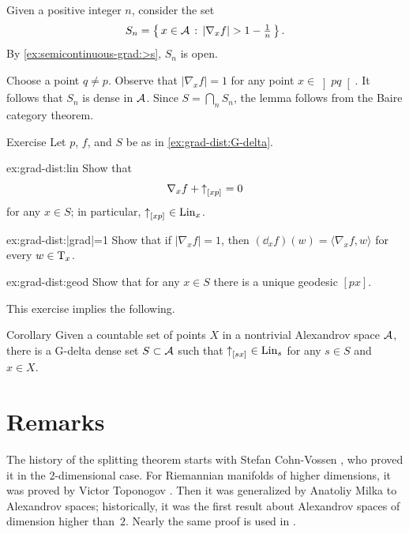 Given a positive integer $n$, consider the set
\[S_n=\set{x\in\spc{A}}{|\nabla_xf|>1-\tfrac1n}.\]
By \ref{ex:semicontinuous-grad:>s}, $S_n$ is open.

Choose a point $q\ne p$.
Observe that $|\nabla_xf|=1$ for any point $x\in\left]pq\right[$.
It follows that $S_n$ is dense in $\mathcal{A}$.
Since $S=\bigcap_nS_n$, the lemma follows from the Baire category theorem.
\qeds


\begin{thm}[!]{Exercise}\label{ex:grad-dist}
Let $p$, $f$, and $S$ be as in \ref{ex:grad-dist:G-delta}.

\begin{subthm}{ex:grad-dist:lin}
Show that 
\[\nabla_xf+{\uparrow}_{[{x}{p}]_{{}}}=0\]
for any 
$x\in S$;
in particular, ${\uparrow}_{[{x}{p}]_{{}}}\in \mathop{\rm Lin}\nolimits_x$.
\end{subthm}

\begin{subthm}{ex:grad-dist:|grad|=1}
Show that if $|\nabla_xf|=1$, then $(\dd_xf)(w)= \langle\nabla_xf,w\rangle$ for every $w\z\in \T_x$.
\end{subthm}

\begin{subthm}{ex:grad-dist:geod}
Show that for any $x\in S$ there is a unique geodesic $[px]$.
\end{subthm}

\end{thm}

This exercise implies the following.

\begin{thm}{Corollary}\label{cor:euclid-subcone}
Given a countable set of points $X$ in a nontrivial Alexandrov space $\mathcal{A}$,
there is a G-delta dense set $S\subset\mathcal{A}$
such that 
${\uparrow}_{[{s}{x}]_{{}}}\in \mathop{\rm Lin}\nolimits_s$
for any $s\in S$ and $x\in X$.
\end{thm}

\section{Remarks}

The history of the splitting theorem starts with Stefan Cohn-Vossen \cite{cohn-vossen_line},
who proved it in the $2$-dimensional case.
For Riemannian manifolds of higher dimensions,
it was proved by Victor Toponogov \cite{toponogov-globalization+splitting}.
Then it was generalized by Anatoliy Milka \cite{milka-line}
to Alexandrov spaces;
historically, it was the first result about Alexandrov spaces of dimension higher than~$2$.
Nearly the same proof is used in \cite[1.5]{burago-burago-ivanov}.


